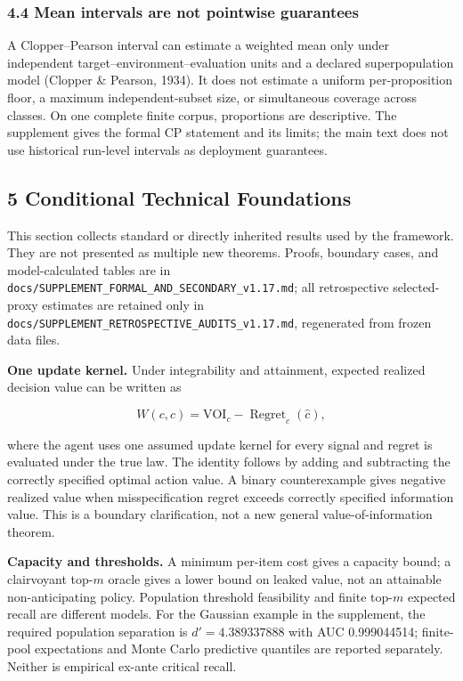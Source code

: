 \documentclass[
  11pt]{article}
\begin{document}
\subsubsection{4.4 Mean intervals are not pointwise
guarantees}\label{mean-intervals-are-not-pointwise-guarantees}

A Clopper--Pearson interval can estimate a weighted mean only under
independent target--environment--evaluation units and a declared
superpopulation model (Clopper \& Pearson, 1934). It does not estimate a
uniform per-proposition floor, a maximum independent-subset size, or
simultaneous coverage across classes. On one complete finite corpus,
proportions are descriptive. The supplement gives the formal CP
statement and its limits; the main text does not use historical
run-level intervals as deployment guarantees.

\subsection{5 Conditional Technical
Foundations}\label{conditional-technical-foundations}

This section collects standard or directly inherited results used by the
framework. They are not presented as multiple new theorems. Proofs,
boundary cases, and model-calculated tables are in
\texttt{docs/SUPPLEMENT\_FORMAL\_AND\_SECONDARY\_v1.17.md}; all
retrospective selected-proxy estimates are retained only in
\texttt{docs/SUPPLEMENT\_RETROSPECTIVE\_AUDITS\_v1.17.md}, regenerated
from frozen data files.

\textbf{One update kernel.} Under integrability and attainment, expected
realized decision value can be written as

\[W(c,\hat c)=\mathrm{VOI}_c-\operatorname{Regret}_c(\hat c),\tag{7}\]

where the agent uses one assumed update kernel for every signal and
regret is evaluated under the true law. The identity follows by adding
and subtracting the correctly specified optimal action value. A binary
counterexample gives negative realized value when misspecification
regret exceeds correctly specified information value. This is a boundary
clarification, not a new general value-of-information theorem.

\textbf{Capacity and thresholds.} A minimum per-item cost gives a
capacity bound; a clairvoyant top-\(m\) oracle gives a lower bound on
leaked value, not an attainable non-anticipating policy. Population
threshold feasibility and finite top-\(m\) expected recall are different
models. For the Gaussian example in the supplement, the required
population separation is \(d'=4.389337888\) with AUC 0.999044514;
finite-pool expectations and Monte Carlo predictive quantiles are
reported separately. Neither is empirical ex-ante critical recall.
\end{document}
